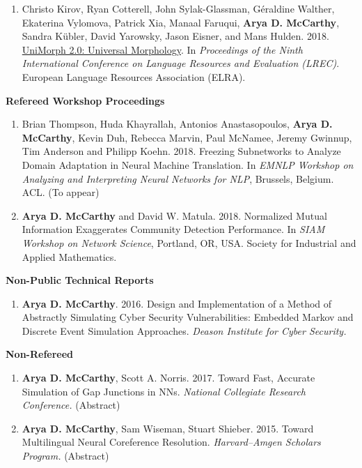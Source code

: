 \documentclass[margin, 10pt]{res} %
\begin{document}
\begin{resume}
\begin{enumerate}
\item Christo Kirov, Ryan Cotterell, John Sylak-Glassman, G\'eraldine Walther, Ekaterina Vylomova, Patrick Xia, Manaal Faruqui, \textbf{Arya D. McCarthy}, Sandra K{\"u}bler, David Yarowsky, Jason Eisner, and Mans Hulden. 2018. \href{http://www.lrec-conf.org/proceedings/lrec2018/pdf/789.pdf}{UniMorph 2.0: Universal Morphology}. In \emph{Proceedings of the Ninth International Conference on Language Resources and Evaluation (LREC)}. European Language Resources Association (ELRA).
\end{enumerate}

\textbf{Refereed Workshop Proceedings}
\begin{enumerate}[resume]
\item Brian Thompson, Huda Khayrallah, Antonios Anastasopoulos, \textbf{Arya D. McCarthy}, Kevin Duh, Rebecca Marvin, Paul McNamee, Jeremy Gwinnup, Tim Anderson and Philipp Koehn. 2018. Freezing Subnetworks to Analyze Domain Adaptation in Neural Machine Translation. In \emph{EMNLP Workshop on Analyzing and Interpreting Neural Networks for NLP}, Brussels, Belgium. ACL. (To appear)

\item \textbf{Arya D. McCarthy} and David W. Matula. 2018. Normalized Mutual Information Exaggerates Community Detection Performance. In \emph{SIAM Workshop on Network Science}, Portland, OR, USA. Society for Industrial and Applied Mathematics.
\end{enumerate}

\begin{samepage}
\textbf{Non-Public Technical Reports}
\begin{enumerate}[resume]
\item \textbf{Arya D. McCarthy}. 2016. Design and Implementation of a Method of Abstractly Simulating Cyber Security Vulnerabilities: Embedded Markov and Discrete Event Simulation Approaches. \emph{Deason Institute for Cyber Security.}
\end{enumerate}
\end{samepage}

\begin{samepage}
\textbf{Non-Refereed}
\begin{enumerate}
\item \textbf{Arya D. McCarthy}, Scott A. Norris. 2017. Toward Fast, Accurate Simulation of Gap Junctions in NNs. \emph{National Collegiate Research Conference.} (Abstract)
\item \textbf{Arya D. McCarthy}, Sam Wiseman, Stuart Shieber. 2015. Toward Multilingual Neural Coreference Resolution. \emph{Harvard--Amgen Scholars Program.} (Abstract)
\end{enumerate}
\end{samepage}



\end{resume}
\end{document}

